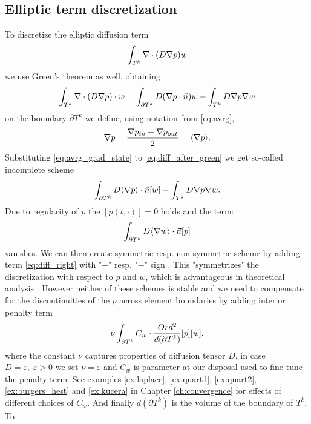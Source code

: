 \subsection{Elliptic term discretization}
\label{se:diff_term}
To discretize the elliptic diffusion term
$$
\int_{T^k}\nabla\cdot(D\nabla p) w
$$
we use Green's theorem as well, obtaining
\begin{equation}
    \label{eq:diff_after_green}
    \int_{T^k}\nabla \cdot (D \nabla p)\cdot w  = \int_{\partial T^k} D(\nabla p\cdot\vec{n}) w - \int_{T^k} D\nabla p \nabla w
\end{equation}
on the boundary $\partial T^k$ we define, using notation from \eqref{eq:avrg},
\begin{equation}
    \nabla p = \frac{\nabla p_{in} + \nabla p_{out}}{2} = \langle\nabla p\rangle.
    \label{eq:avrg_grad_state}
\end{equation}
Substituting \eqref{eq:avrg_grad_state} to \eqref{eq:diff_after_green} we get 
so-called incomplete scheme
\begin{equation}
        \int_{\partial T^k} D \langle\nabla p\rangle \cdot \vec{n} [w] - \int_{T^k} D\nabla p 
        \nabla w.
\end{equation}
Due to regularity of $p$ the $[p(t, \cdot)] = 0$ holds \cite[p. 14]{Kucera} and the term:
\begin{equation}\label{eq:diff_right}
    \int_{\partial T^k} D \langle\nabla w \rangle\cdot \vec{n} [p]
\end{equation}
vanishes.
We can then create symmetric resp. non-symmetric scheme by adding term 
\eqref{eq:diff_right} with "$+$" resp. "$-$" sign \cite[p. 14]{Kucera}. This 
"symmetrizes" the discretization with respect to $p$ and $w$, which is advantageous in 
theoretical analysis \cite[p. 39]{Dolejsi2015}.
However neither of these schemes is stable and we need to compensate for the 
discontinuities of the $p$ across element boundaries by adding interior penalty term 
\cite{Kucera, Antonietti2013, Dolejsi2015}
\begin{equation}
    \nu \int_{\partial T^k} C_w \cdot \frac{Ord^2}{d(\partial T^k)} [p][w],
\end{equation}
where the constant $\nu$ captures properties of diffusion tensor $D$, in case $D = 
\varepsilon, \; \varepsilon > 0$ we set $\nu = \varepsilon$ and $C_w$ is 
parameter at our disposal used to fine tune the penalty term.
See examples \ref{ex:laplace}, \ref{ex:quart1}, \ref{ex:quart2}, 
\ref{ex:burgers_hest} and \ref{ex:kucera} in Chapter 
\ref{ch:convergence} for effects of different choices of $C_w$. 
And finally $d(\partial T^k)$ is the volume of the boundary of $T^k$. To 
